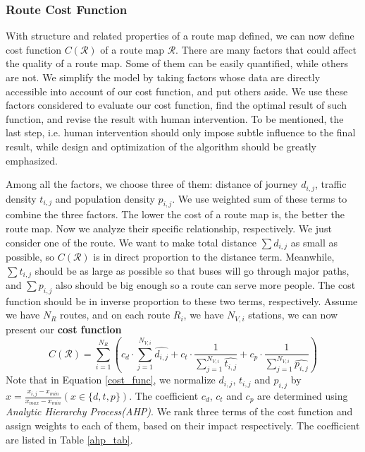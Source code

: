 \documentclass{mcmthesis}
\begin{document}
\subsubsection{Route Cost Function}
With structure and related properties of a route map defined, we can now define cost function $C(\mathscr{R})$ of a route map $\mathscr{R}$. There are many factors that could affect the quality of a route map. Some of them can be easily quantified, while others are not. We simplify the model by taking factors whose data are directly accessible into account of our cost function, and put others aside. We use these factors considered to evaluate our cost function, find the optimal result of such function, and revise the result with human intervention. To be mentioned, the last step, i.e. human intervention should only impose subtle influence to the final result, while design and  optimization of the algorithm should be greatly emphasized.

Among all the factors, we choose three of them: distance of journey $d_{i,j}$, traffic density $t_{i,j}$ and population density $p_{i,j}$. We use weighted sum of these terms to combine the three factors. The lower the cost of a route map is, the better the route map. Now we analyze their specific relationship, respectively. We just consider one of the route. We want to make total distance $\sum d_{i,j}$ as small as possible, so $C(\mathscr{R})$ is in direct proportion to the distance term. Meanwhile, $\sum t_{i,j}$ should be as large as possible so that buses will go through major paths,  and $\sum p_{i,j}$ also should be big enough so a route can serve more people. The cost function should be in inverse proportion to these two terms, respectively. Assume we have $N_R$ routes, and on each route $R_i$, we have $N_{V, i}$ stations, we can now present our \textbf{cost function}
\begin{equation}
C(\mathscr{R}) = \sum_{i=1}^{N_R} (c_d\cdot \sum_{j=1}^{N_{V,i}}\hat{d_{i,j}} + c_t\cdot \frac{1}{\sum_{j=1}^{N_{V,i}}\hat{t_{i,j}}} + c_p\cdot \frac{1}{\sum_{j=1}^{N_{V,i}}\hat{p_{i,j}}})
\label{cost_func}
\end{equation}
Note that in Equation \ref{cost_func}, we normalize $d_{i,j}$, $t_{i,j}$ and $p_{i,j}$ by $x = \frac{x_{i,j} - x_{min}}{x_{max}-x_{min}} (x \in \{d, t, p\})$. The coefficient $c_d$, $c_t$ and $c_p$ are determined using \emph{Analytic Hierarchy Process(AHP)}. We rank three terms of the cost function and assign weights to each of them, based on their impact respectively. The coefficient are listed in Table \ref{ahp_tab}.
\end{document}
